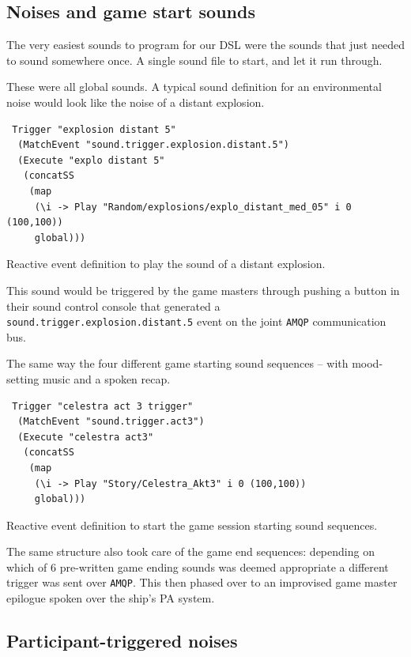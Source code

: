 \subsection{Noises and game start sounds}
\label{sec:noises}

The very easiest sounds to program for our DSL were the sounds that just needed to sound somewhere once. A single sound file to start, and let it run through.

These were all global sounds. A typical sound definition for an
environmental noise would look like the noise of a distant explosion.

\begin{listing}
\begin{verbatim}
 Trigger "explosion distant 5" 
  (MatchEvent "sound.trigger.explosion.distant.5") 
  (Execute "explo distant 5" 
   (concatSS 
    (map 
     (\i -> Play "Random/explosions/explo_distant_med_05" i 0 (100,100))
     global)))
\end{verbatim}
\caption{Reactive event definition to play the sound of a distant explosion.}
\end{listing}
This sound would be triggered by the game masters through pushing a button in their sound control console that generated a \texttt{sound.trigger.explosion.distant.5} event on the joint \texttt{AMQP} communication bus.

The same way the four different game starting sound sequences -- with mood-setting music and a spoken recap.

\begin{listing}
\begin{verbatim}
 Trigger "celestra act 3 trigger" 
  (MatchEvent "sound.trigger.act3") 
  (Execute "celestra act3" 
   (concatSS 
    (map 
     (\i -> Play "Story/Celestra_Akt3" i 0 (100,100)) 
     global)))
\end{verbatim}
\caption{Reactive event definition to start the game session starting
  sound sequences.}
\end{listing}

The same structure also took care of the game end sequences: depending on which of 6 pre-written game ending sounds was deemed appropriate a different trigger was sent over \texttt{AMQP}. This then phased over to an improvised game master epilogue spoken over the ship's PA system.

\subsection{Participant-triggered noises}
\label{sec:part-trigg-nois}

